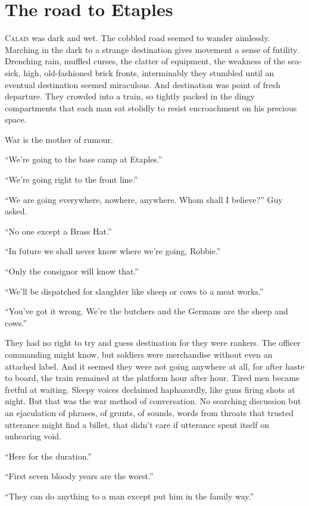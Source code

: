 \chapter*{\textsf{The road to Etaples}}

C\textsc{alais} was dark and wet. The cobbled road seemed to wander aimlessly. 
Marching in the dark to a strange destination gives movement a sense of futility. 
Drenching rain, muffled curses, the clatter of equipment, the weakness of the 
sea-sick, high, old-fashioned brick fronts, interminably they stumbled until 
an eventual destination seemed miraculous. And destination was point of fresh 
departure. They crowded into a train, so tightly packed in the dingy compartments 
that each man sat stolidly to resist encroachment on his precious space.

War is the mother of rumour.

``We're going to the base camp at Etaples.''

``We're going right to the front line.''

``We are going everywhere, nowhere, anywhere. Whom shall I believe?'' Guy asked.

``No one except a Brass Hat.''

``In future we shall never know where we're going, Robbie.''

``Only the consignor will know that.''

``We'll be dispatched for slaughter like sheep or cows to a meat works.''

``You've got it wrong. We're the butchers and the Germans are the sheep and cows.''

They had no right to try and guess destination for they were rankers. The officer 
commanding might know, but soldiers were merchandise without even an attached label. 
And it seemed they were not going anywhere at all, for after haste to board, the 
train remained at the platform hour after hour. Tired men became fretful at waiting. 
Sleepy voices declaimed haphazardly, like guns firing shots at night. But that was 
the war method of conversation. No searching discussion but an ejaculation of phrases,
of grunts, of sounds, words from throats that trusted utterance might find a billet, 
that didn't care if utterance spent itself on unhearing void.

``Here for the duration.''

``First seven bloody years are the worst.''

``They can do anything to a man except put him in the family way.''

